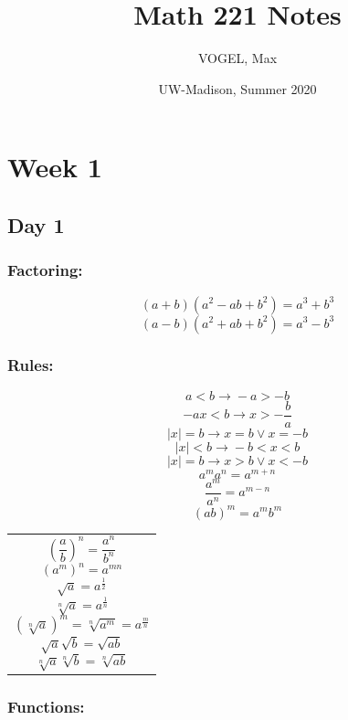 \documentclass[12pt]{article}
\begin{document}
 
\title{Math 221 Notes}
\author{VOGEL, Max}
\date{UW-Madison, Summer 2020}

\setcounter{tocdepth}{4}
\setcounter{secnumdepth}{4}

\maketitle
\tableofcontents
\newpage

\section{Week 1}
\subsection{Day 1}
\subsubsection{Factoring:}
$$(a+b)(a^2-ab+b^2)=a^3+b^3 $$
$$(a-b)(a^2+ab+b^2)=a^3-b^3 $$


\subsubsection{Rules:}
\begin{minipage}{0.45\textwidth}
$$ a < b \rightarrow{} -a > -b $$
$$ -ax < b \rightarrow{} x > -\frac{b}{a} $$
$$ |x| = b \rightarrow{} x = b \vee x = -b $$
$$ |x| < b \rightarrow{} -b < x < b $$
$$ |x| = b \rightarrow{} x > b \vee x < -b $$
$$ a^m a^n = a^{m+n} $$
$$ \frac{a^m}{a^n} = a^{m-n}$$
$$ (ab)^m=a^m b^m$$
\hfill
\end{minipage}
\begin{minipage}{0.45\textwidth}
\begin{tabular}{|p{\textwidth}}
$$ \left(\frac{a}{b}\right)^n = \frac{a^n}{b^n}$$
$$ (a^m)^n = a^{mn}$$
$$ \sqrt{a} = a^{\frac{1}{2}}$$
$$ \sqrt[n]{a} = a^{\frac{1}{n}}$$
$$ \left(\sqrt[n]{a}\right)^m = \sqrt[n]{a^m} = a^{\frac{m}{n}}$$
$$ \sqrt{a}\sqrt{b} = \sqrt{ab}$$
$$ \sqrt[n]{a} \sqrt[n]{b} = \sqrt[n]{ab}$$\\
\end{tabular}
\end{minipage}

\subsubsection{Functions:}
\end{document}
